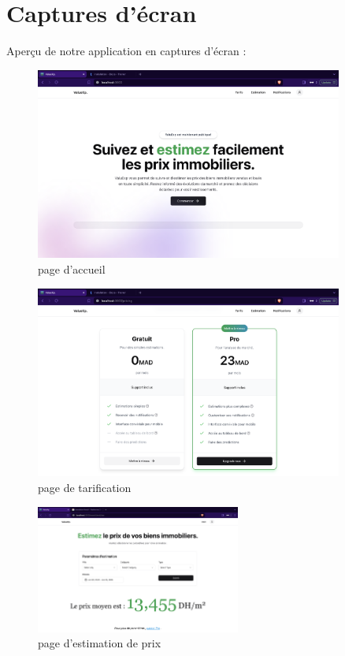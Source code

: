 \documentclass[a4paper,12pt]{report}
\numberwithin{equation}{section}
\begin{document}
\section{Captures d'écran}
Aperçu de notre application en captures d'écran :
\begin{figure}[H]
    \centering
    \includegraphics[width=0.9\textwidth]{screens/home.png}
    \caption{page d'accueil}
    \label{fig:page d'accueil}
\end{figure}
\begin{figure}[H]
    \centering
    \includegraphics[width=0.9\textwidth]{screens/pricing.png}
    \caption{page de tarification}
    \label{fig:page de tarification}
\end{figure}
\begin{figure}[H]
    \centering
    \includegraphics[width=0.6\textwidth]{screens/estimation.png}
    \caption{page d'estimation de prix}
    \label{fig:page d'estimation de prix}
\end{figure}
\end{document}
